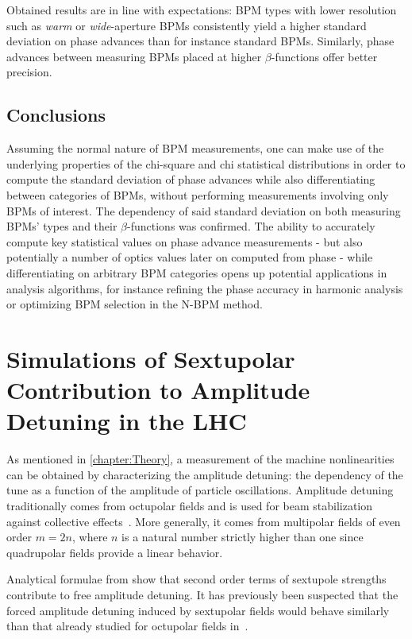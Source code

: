 Obtained results are in line with expectations: BPM types with lower resolution such as \textit{warm} or \textit{wide}-aperture BPMs consistently yield a higher standard deviation on phase advances than for instance standard BPMs.
Similarly, phase advances between measuring BPMs placed at higher \(\beta\)-functions offer better precision.

\subsection*{Conclusions}

Assuming the normal nature of BPM measurements, one can make use of the underlying properties of the chi-square and chi statistical distributions in order to compute the standard deviation of phase advances while also differentiating between categories of BPMs, without performing measurements involving only BPMs of interest.
The dependency of said standard deviation on both measuring BPMs' types and their \(\beta\)-functions was confirmed.
The ability to accurately compute key statistical values on phase advance measurements - but also potentially a number of optics values later on computed from phase - while differentiating on arbitrary BPM categories opens up potential applications in analysis algorithms, for instance refining the phase accuracy in harmonic analysis or optimizing BPM selection in the N-BPM method.

\section{Simulations of Sextupolar Contribution to Amplitude Detuning in the LHC}


As mentioned in \cref{chapter:Theory}, a measurement of the machine nonlinearities can be obtained by characterizing the amplitude detuning: the dependency of the tune as a function of the amplitude of particle oscillations.
Amplitude detuning traditionally comes from octupolar fields and is used for beam stabilization against collective effects~\cite{BOOK:Chao:Collective_instabilities,PRAB:Karpov:Thresholds_Loss_Landau_Damping}.
More generally, it comes from multipolar fields of even order \(m = 2n\), where \(n\) is a natural number strictly higher than one since quadrupolar fields provide a linear behavior.

Analytical formulae from \cite{REPORT:Bengtsson:Smear_Tune_Shift, BOOK:Lee:Accelerator_physics,BOOK:Chao:Handbook_Accelerator_Physics_Engineering} show that second order terms of sextupole strengths contribute to free amplitude detuning.
It has previously been suspected that the forced amplitude detuning induced by sextupolar fields would behave similarly than that already studied for octupolar fields in~\cite{PRAB:White:Direct_Amplitude_Detuning_AC_Dipole}.


